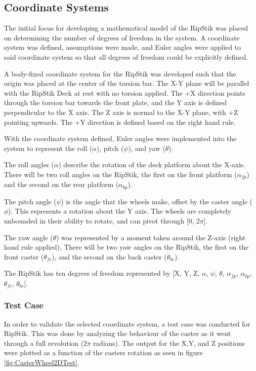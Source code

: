 \documentclass[12pt,letterpaper]{article}
\begin{document}
\subsection{Coordinate Systems}
The initial focus for developing a mathematical model of the RipStik was placed on determining the number of degrees of freedom in the system. 
A coordinate system was defined, assumptions were made, and Euler angles were applied to said coordinate system so that all degrees of freedom could be explicitly defined.
\par
A body-fixed coordinate system for the RipStik was developed such that the origin was placed at the center of the torsion bar. The X-Y plane will be parallel with the RipStik Deck at rest with no torsion applied.
The +X direction points through the torsion bar towards the front plate, and the Y axis is defined perpendicular to the X axis. The Z axis is normal to the X-Y plane, with +Z pointing upwards. The +Y direction is defined based on the right hand rule.

With the coordinate system defined, Euler angles were implemented into the system to represent the roll ($\alpha$), pitch ($\psi$), and yaw ($\theta$).
\par
The roll angles ($\alpha$) describe the rotation of the deck platform about the X-axis. There will be two roll angles on the RipStik, the first on the front platform ($\alpha_{fp}$) and the second on the rear platform ($\alpha_{bp}$).
\par
The pitch angle ($\psi$) is the angle that the wheels make, offset by the caster angle ($\phi$). This represents a rotation about the Y axis. The wheels are completely unbounded in their ability to rotate, and can pivot through [0, 2$\pi$].
\par
The yaw angle ($\theta$) was represented by a moment taken around the Z-axis (right hand rule applied). There will be two yaw angles on the RipStik, the first on the front caster ($\theta_{fc}$), and the second on the back caster ($\theta_{bc}$).

The RipStik has ten degrees of freedom represented by [X, Y, Z, $\alpha$, $\psi$, $\theta$, $\alpha_{fp}$, $\alpha_{bp}$, $\theta_{fc}$, $\theta_{bc}$].

\subsubsection{Test Case}

In order to validate the selected coordinate system, a test case was conducted for RipStik. This was done by analyzing the behaviour of the caster as it went through a full revolution (2$\pi$ radians).
The output for the X,Y, and Z positions were plotted as a function of the casters rotation as seen in figure \ref{fig:CasterWheel2DTest}.
\end{document}
